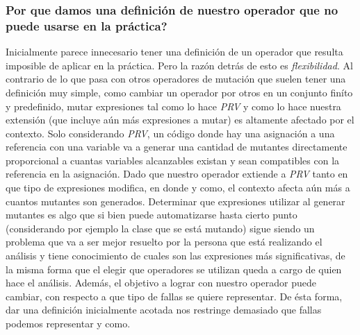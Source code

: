 \subsubsection{Por que damos una definici\'on de nuestro operador que no puede usarse en la pr\'actica?}
Inicialmente parece innecesario tener una definici\'on de un operador que resulta imposible de aplicar en la pr\'actica. Pero la raz\'on detr\'as de esto es \emph{flexibilidad}. Al contrario de lo que pasa con otros operadores de mutaci\'on que suelen tener una definici\'on muy simple, como cambiar un operador por otros en un conjunto fin\'ito y predefinido, mutar expresiones tal como lo hace \emph{PRV} y como lo hace nuestra extensi\'on (que incluye a\'un m\'as expresiones a mutar) es altamente afectado por el contexto. Solo considerando \emph{PRV}, un c\'odigo donde hay una asignaci\'on a una referencia con una variable va a generar una cantidad de mutantes directamente proporcional a cuantas variables alcanzables existan y sean compatibles con la referencia en la asignaci\'on. Dado que nuestro operador extiende a \emph{PRV} tanto en que tipo de expresiones modifica, en donde y como, el contexto afecta a\'un m\'as a cuantos mutantes son generados. Determinar que expresiones utilizar al generar mutantes es algo que si bien puede automatizarse hasta cierto punto (considerando por ejemplo la clase que se est\'a mutando) sigue siendo un problema que va a ser mejor resuelto por la persona que est\'a realizando el an\'alisis y tiene conocimiento de cuales son las expresiones m\'as significativas, de la misma forma que el elegir que operadores se utilizan queda a cargo de quien hace el an\'alisis. Adem\'as, el objetivo a lograr con nuestro operador puede cambiar, con respecto a que tipo de fallas se quiere representar. De \'esta forma, dar una definici\'on inicialmente acotada nos restringe demasiado que fallas podemos representar y como.

